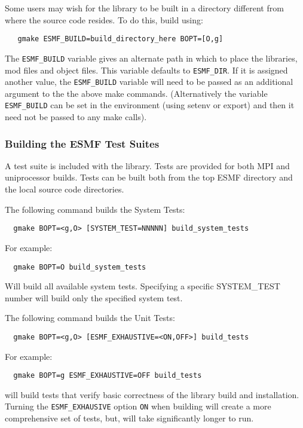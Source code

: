 Some users may wish for the library to be built in a directory different from 
where the source code resides.  To do this, build using:
\begin{verbatim}
   gmake ESMF_BUILD=build_directory_here BOPT=[O,g]
\end{verbatim}

The {\tt ESMF\_BUILD} variable gives an alternate path in which to place the libraries,
mod files and object files.  This variable defaults to {\tt ESMF\_DIR}.  If it is 
assigned another value, the {\tt ESMF\_BUILD} variable will need to be passed as
an additional argument to the the above make commands.  (Alternatively the variable
{\tt ESMF\_BUILD} can be set in the environment (using setenv or export) and then it 
need not be passed to any make calls).


\subsubsection{Building the ESMF Test Suites}
\label{BuildTestSuite}
A test suite is included with the library. Tests are provided for both MPI
and uniprocessor builds. Tests can be built both from the top ESMF directory and
the local source code directories.

\noindent The following command builds the System Tests:
\begin{verbatim}
  gmake BOPT=<g,O> [SYSTEM_TEST=NNNNN] build_system_tests
\end{verbatim}

For example:
\begin{verbatim}
  gmake BOPT=O build_system_tests
\end{verbatim}
Will build all available system tests. Specifying a specific SYSTEM\_TEST number will build only the specified system test.

\noindent The following command builds the Unit Tests:
\begin{verbatim}
  gmake BOPT=<g,O> [ESMF_EXHAUSTIVE=<ON,OFF>] build_tests
\end{verbatim}

For example:
\begin{verbatim}
  gmake BOPT=g ESMF_EXHAUSTIVE=OFF build_tests
\end{verbatim}
will build tests that verify basic correctness of the library build and installation. Turning the {\tt ESMF\_EXHAUSIVE} option {\tt ON} when building will create a more comprehensive set of tests, but, will take significantly longer to run. 

